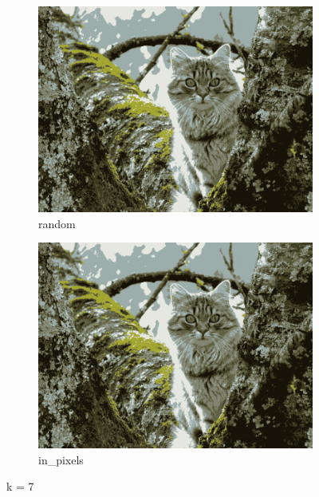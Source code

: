 \documentclass{article}
\begin{document}
\begin{figure}[h!]
  \begin{subfigure}{.5\textwidth}
    \centering
    \includegraphics[width=.8\linewidth]{image/random_7.png}
    \caption{random}
    \label{fig:sfig5}
  \end{subfigure}%
  \begin{subfigure}{.5\textwidth}
    \centering
    \includegraphics[width=.8\linewidth]{image/in_7.png}
    \caption{in\_pixels}
    \label{fig:sfig6}
  \end{subfigure}
  \caption{k = 7}
  \label{fig:fig2}
\end{figure}

\pagebreak
\end{document}
